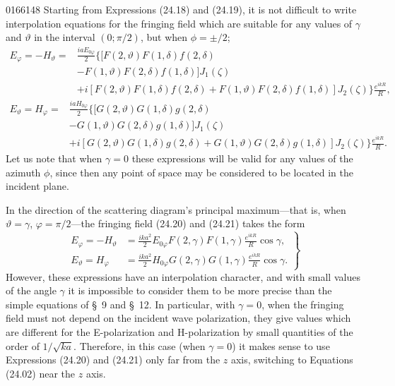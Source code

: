 \begin{scanpage}{0166}{148}
Starting from Expressions (24.18) and (24.19), it is not difficult to write interpolation equations for the fringing field which are suitable for any values of $\gamma$ and $\vartheta$ in the interval $(0;\pi/2)$, but when $\phi=\pm/2$;
\[
\begin{aligned}E_\varphi=-H_\vartheta={}&\frac{iaE_{0\varphi}}2\bigl\{[F(2,\vartheta)F(1,\delta)f(2,\delta)\\&-F(1,\vartheta)F(2,\delta)f(1,\delta)]J_1(\zeta)\\&+i[F(2,\vartheta)F(1,\delta)f(2,\delta)+F(1,\vartheta)F(2,\delta)f(1,\delta)]J_2(\zeta)\bigr\}\frac{e^{ikR}}R,
\end{aligned}\tag{24.20}
\]
\[
\begin{aligned}E_\vartheta=H_\varphi={}&\frac{iaH_{0\varphi}}2\bigl\{[G(2,\vartheta)G(1,\delta)g(2,\delta)\\&-G(1,\vartheta)G(2,\delta)g(1,\delta)]J_1(\zeta)\\&+i[G(2,\vartheta)G(1,\delta)g(2,\delta)+G(1,\vartheta)G(2,\delta)g(1,\delta)]J_2(\zeta)\bigr\}\frac{e^{ikR}}R.
\end{aligned}\tag{24.21}
\]
Let us note that when $\gamma=0$ these expressions will be valid for any values of the azimuth $\phi$, since then any point of space may be considered to be located in the incident plane.

In the direction of the scattering diagram's principal maximum---that is, when $\vartheta=\gamma$, $\varphi=\pi/2$---the fringing field (24.20) and (24.21) takes the form
\[
\left.\begin{aligned}E_\varphi=-H_\vartheta&=\frac{ika^2}2E_{0\varphi}F(2,\gamma)F(1,\gamma)\frac{e^{ikR}}R\cos\gamma,\\
E_\vartheta=H_\varphi&=\frac{ika^2}2H_{0\varphi}G(2,\gamma)G(1,\gamma)\frac{e^{ikR}}R\cos\gamma.
\end{aligned}\right\}\tag{24.22}
\]
However, these expressions have an interpolation character, and with small values of the angle $\gamma$ it is impossible to consider them to be more precise than the simple equations of \S~9 and \S~12. In particular, with $\gamma=0$, when the fringing field must not depend on the incident wave polarization, they give values which are different for the E-polarization and H-polarization by small quantities of the order of $1/\sqrt{ka}$. Therefore, in this case (when $\gamma=0$) it makes sense to use Expressions (24.20) and (24.21) only far from the $z$ axis, switching to Equations (24.02) near the $z$ axis.
\end{scanpage}
